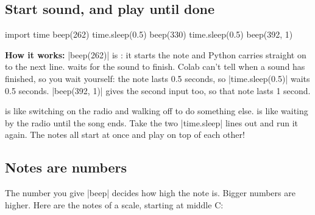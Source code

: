 \subsection*{Start sound, and play until done}

\begin{tcbraster}[raster columns=2, raster equal height=rows, raster column skip=12pt, raster valign=center]
\begin{tcolorbox}[colback=white, colframe=white, boxrule=0pt, valign=center]
\begin{scratch}
\end{scratch}
\end{tcolorbox}
\begin{code}
import time
beep(262)
time.sleep(0.5)
beep(330)
time.sleep(0.5)
beep(392, 1)
\end{code}
\end{tcbraster}

\textbf{How it works:} \py|beep(262)| is : it starts the note and Python carries straight on to the next line.  waits for the sound to finish. Colab can't tell when a sound has finished, so you wait yourself: the note lasts 0.5 seconds, so \py|time.sleep(0.5)| waits 0.5 seconds. \py|beep(392, 1)| gives the second input too, so that note lasts 1 second.

\begin{think}
 is like switching on the radio and walking off to do something else.  is like waiting by the radio until the song ends. Take the two \py|time.sleep| lines out and run it again. The notes all start at once and play on top of each other!
\end{think}

\subsection*{Notes are numbers}

The number you give \py|beep| decides how high the note is. Bigger numbers are higher. Here are the notes of a scale, starting at middle C:

